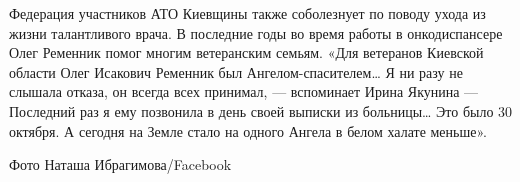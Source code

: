 Федерация участников АТО Киевщины также соболезнует по поводу ухода
из жизни талантливого врача. В последние годы во время работы
в онкодиспансере Олег Ременник помог многим ветеранским семьям. «Для
ветеранов Киевской области Олег Исакович Ременник был Ангелом-спасителем…
Я ни разу не слышала отказа, он всегда всех принимал, --- вспоминает Ирина
Якунина --- Последний раз я ему позвонила в день своей выписки из больницы…
Это было 30 октября. А сегодня на Земле стало на одного Ангела в белом
халате меньше».

Фото Наташа Ибрагимова/Facebook
